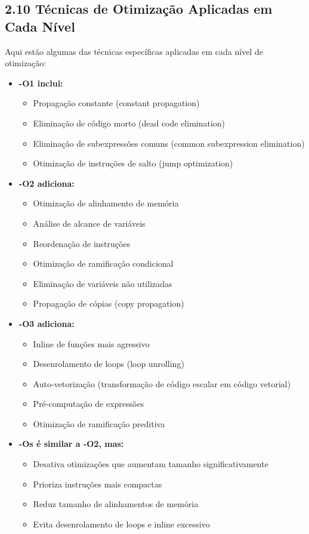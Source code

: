 \documentclass[12pt,a4paper]{article}
\begin{document}
\subsection*{2.10 Técnicas de Otimização Aplicadas em Cada Nível}
Aqui estão algumas das técnicas específicas aplicadas em cada nível de otimização:
\begin{itemize}[leftmargin=*]
    \item \textbf{-O1 inclui:}
    \begin{itemize}
        \item Propagação constante (constant propagation)
        \item Eliminação de código morto (dead code elimination)
        \item Eliminação de subexpressões comuns (common subexpression elimination)
        \item Otimização de instruções de salto (jump optimization)
    \end{itemize}
    \item \textbf{-O2 adiciona:}
    \begin{itemize}
        \item Otimização de alinhamento de memória
        \item Análise de alcance de variáveis
        \item Reordenação de instruções
        \item Otimização de ramificação condicional
        \item Eliminação de variáveis não utilizadas
        \item Propagação de cópias (copy propagation)
    \end{itemize}
    \item \textbf{-O3 adiciona:}
    \begin{itemize}
        \item Inline de funções mais agressivo
        \item Desenrolamento de loops (loop unrolling)
        \item Auto-vetorização (transformação de código escalar em código vetorial)
        \item Pré-computação de expressões
        \item Otimização de ramificação preditiva
    \end{itemize}
    \item \textbf{-Os é similar a -O2, mas:}
    \begin{itemize}
        \item Desativa otimizações que aumentam tamanho significativamente
        \item Prioriza instruções mais compactas
        \item Reduz tamanho de alinhamentos de memória
        \item Evita desenrolamento de loops e inline excessivo
    \end{itemize}
\end{itemize}
\end{document}
